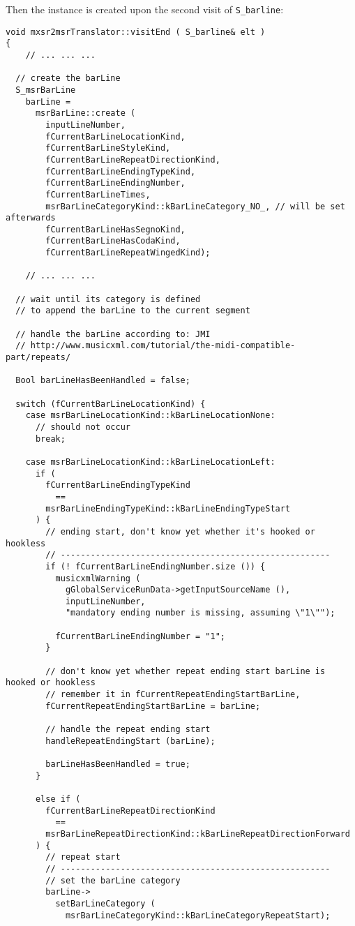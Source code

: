 Then the  instance is created upon the second visit of {\tt S_barline}:%
\begin{lstlisting}[language=CPlusPlus]
void mxsr2msrTranslator::visitEnd ( S_barline& elt )
{
	// ... ... ...

  // create the barLine
  S_msrBarLine
    barLine =
      msrBarLine::create (
        inputLineNumber,
        fCurrentBarLineLocationKind,
        fCurrentBarLineStyleKind,
        fCurrentBarLineRepeatDirectionKind,
        fCurrentBarLineEndingTypeKind,
        fCurrentBarLineEndingNumber,
        fCurrentBarLineTimes,
        msrBarLineCategoryKind::kBarLineCategory_NO_, // will be set afterwards
        fCurrentBarLineHasSegnoKind,
        fCurrentBarLineHasCodaKind,
        fCurrentBarLineRepeatWingedKind);

	// ... ... ...

  // wait until its category is defined
  // to append the barLine to the current segment

  // handle the barLine according to: JMI
  // http://www.musicxml.com/tutorial/the-midi-compatible-part/repeats/

  Bool barLineHasBeenHandled = false;

  switch (fCurrentBarLineLocationKind) {
    case msrBarLineLocationKind::kBarLineLocationNone:
      // should not occur
      break;

    case msrBarLineLocationKind::kBarLineLocationLeft:
      if (
        fCurrentBarLineEndingTypeKind
          ==
        msrBarLineEndingTypeKind::kBarLineEndingTypeStart
      ) {
        // ending start, don't know yet whether it's hooked or hookless
        // ------------------------------------------------------
        if (! fCurrentBarLineEndingNumber.size ()) {
          musicxmlWarning (
            gGlobalServiceRunData->getInputSourceName (),
            inputLineNumber,
            "mandatory ending number is missing, assuming \"1\"");

          fCurrentBarLineEndingNumber = "1";
        }

        // don't know yet whether repeat ending start barLine is hooked or hookless
        // remember it in fCurrentRepeatEndingStartBarLine,
        fCurrentRepeatEndingStartBarLine = barLine;

        // handle the repeat ending start
        handleRepeatEndingStart (barLine);

        barLineHasBeenHandled = true;
      }

      else if (
        fCurrentBarLineRepeatDirectionKind
          ==
        msrBarLineRepeatDirectionKind::kBarLineRepeatDirectionForward
      ) {
        // repeat start
        // ------------------------------------------------------
        // set the barLine category
        barLine->
          setBarLineCategory (
            msrBarLineCategoryKind::kBarLineCategoryRepeatStart);


\end{lstlisting}
